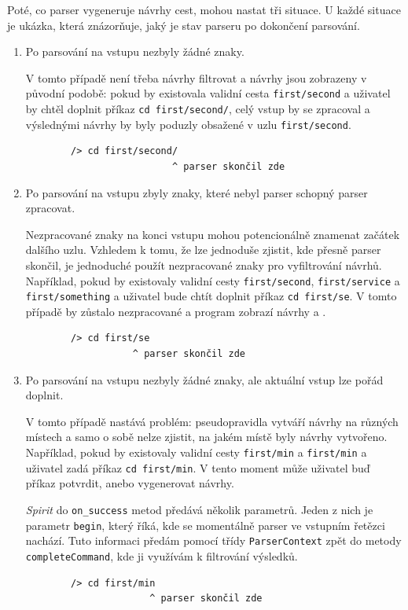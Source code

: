 \documentclass[thesis=B,czech,hidelinks]{FITthesis}[2019/03/06]
\begin{document}
Poté, co parser vygeneruje návrhy cest, mohou nastat tři situace. U každé situace je ukázka, která znázorňuje, jaký je stav parseru po dokončení parsování.
\begin{enumerate}
    \item Po parsování na vstupu nezbyly žádné znaky.

        V tomto případě není třeba návrhy filtrovat a návrhy jsou zobrazeny v původní podobě: pokud by existovala validní cesta \texttt{first/second} a uživatel by chtěl doplnit příkaz \texttt{cd first/second/}, celý vstup by se zpracoval a výslednými návrhy by byly poduzly obsažené v uzlu \texttt{first/second}.
        \begin{verbatim}
        /> cd first/second/
                          ^ parser skončil zde
        \end{verbatim}
    \item Po parsování na vstupu zbyly znaky, které nebyl parser schopný parser zpracovat.

        Nezpracované znaky na konci vstupu mohou potencionálně znamenat začátek dalšího uzlu. Vzhledem k tomu, že lze jednoduše zjistit, kde přesně parser skončil, je jednoduché použít nezpracované znaky pro vyfiltrování návrhů. Například, pokud by existovaly validní cesty \texttt{first/second}, \texttt{first/service} a \texttt{first/something} a uživatel bude chtít doplnit příkaz \texttt{cd first/se}. V tomto případě by  zůstalo nezpracované a program zobrazí návrhy  a .
        \begin{verbatim}
        /> cd first/se
                   ^ parser skončil zde
        \end{verbatim}
    \item Po parsování na vstupu nezbyly žádné znaky, ale aktuální vstup lze pořád doplnit.

        V tomto případě nastává problém: pseudopravidla vytváří návrhy na různých místech a samo o sobě nelze zjistit, na jakém místě byly návrhy vytvořeno. Například, pokud by existovaly validní cesty \texttt{first/min} a \texttt{first/min} a uživatel zadá příkaz \texttt{cd first/min}. V tento moment může uživatel buď příkaz potvrdit, anebo vygenerovat návrhy.

        \textit{Spirit} do \texttt{on\_success} metod předává několik parametrů. Jeden z nich je parametr \texttt{begin}, který říká, kde se momentálně parser ve vstupním řetězci nachází. Tuto informaci předám pomocí třídy \texttt{ParserContext} zpět do metody \texttt{completeCommand}, kde ji využívám k filtrování výsledků.
        \begin{verbatim}
        /> cd first/min
                      ^ parser skončil zde
        \end{verbatim}
\end{enumerate}
\end{document}
